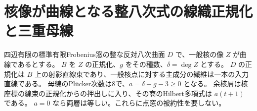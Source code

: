 \section{核像が曲線となる整八次式の線織正規化と三重母線}
\label{sec:kernel-curve-scroll}
\begin{theorem}\label{thm:kernel-curve-scroll}
四辺有限の標準有限Frobenius窓の整な反対八次曲面 $D$ で、一般核の像 $Z$ が曲線であるとする。
$B$ を $Z$ の正規化、$g$ をその種数、$\delta=\deg Z$ とする。
$D$ の正規化は $B$ 上の射影直線束であり、一般核点に対する主成分の繊維は一本の入力直線である。
母線のPlücker次数は8で、$a=\delta-g-3\ge0$ となる。
余核層は核座標の線束の正規化からの押出しに入り、その商のHilbert多項式は $a(t+1)$ である。
$a=0$ なら両層は等しい。これらに点窓の被約性を要しない。
\end{theorem}
